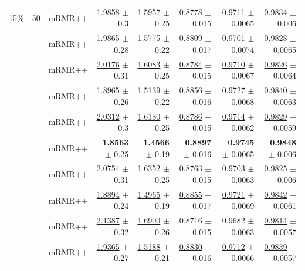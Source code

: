 \begin{longtable}{llp{}rrrrr}
\midrule
15\% & 50 & mRMR++ & \underline{1.9858} {\scriptsize $\pm$ 0.3} & \underline{1.5957} {\scriptsize $\pm$ 0.25} & \underline{0.8778} {\scriptsize $\pm$ 0.015} & \underline{0.9711} {\scriptsize $\pm$ 0.0065} & \underline{0.9834} {\scriptsize $\pm$ 0.006} \\
 &  & mRMR++ & \underline{1.9865} {\scriptsize $\pm$ 0.28} & \underline{1.5775} {\scriptsize $\pm$ 0.22} & \underline{0.8809} {\scriptsize $\pm$ 0.017} & \underline{0.9701} {\scriptsize $\pm$ 0.0074} & \underline{0.9828} {\scriptsize $\pm$ 0.0065} \\
 &  & mRMR++ & \underline{2.0176} {\scriptsize $\pm$ 0.31} & \underline{1.6083} {\scriptsize $\pm$ 0.25} & \underline{0.8784} {\scriptsize $\pm$ 0.015} & \underline{0.9710} {\scriptsize $\pm$ 0.0067} & \underline{0.9826} {\scriptsize $\pm$ 0.0064} \\
 &  & mRMR++ & \underline{1.8965} {\scriptsize $\pm$ 0.26} & \underline{1.5139} {\scriptsize $\pm$ 0.22} & \underline{0.8856} {\scriptsize $\pm$ 0.016} & \underline{0.9727} {\scriptsize $\pm$ 0.0068} & \underline{0.9840} {\scriptsize $\pm$ 0.0063} \\
 &  & mRMR++ & \underline{2.0312} {\scriptsize $\pm$ 0.3} & \underline{1.6180} {\scriptsize $\pm$ 0.25} & \underline{0.8786} {\scriptsize $\pm$ 0.015} & \underline{0.9714} {\scriptsize $\pm$ 0.0062} & \underline{0.9829} {\scriptsize $\pm$ 0.0059} \\
 &  & mRMR++ & \textbf{1.8563} {\scriptsize $\pm$ 0.25} & \textbf{1.4566} {\scriptsize $\pm$ 0.19} & \textbf{0.8897} {\scriptsize $\pm$ 0.016} & \textbf{0.9745} {\scriptsize $\pm$ 0.0065} & \textbf{0.9848} {\scriptsize $\pm$ 0.006} \\
 &  & mRMR++ & \underline{2.0754} {\scriptsize $\pm$ 0.31} & \underline{1.6352} {\scriptsize $\pm$ 0.25} & \underline{0.8763} {\scriptsize $\pm$ 0.015} & \underline{0.9703} {\scriptsize $\pm$ 0.0063} & \underline{0.9825} {\scriptsize $\pm$ 0.006} \\
 &  & mRMR++ & \underline{1.8894} {\scriptsize $\pm$ 0.24} & \underline{1.4965} {\scriptsize $\pm$ 0.19} & \underline{0.8855} {\scriptsize $\pm$ 0.017} & \underline{0.9721} {\scriptsize $\pm$ 0.0069} & \underline{0.9842} {\scriptsize $\pm$ 0.0061} \\
 &  & mRMR++ & \underline{2.1387} {\scriptsize $\pm$ 0.32} & \underline{1.6900} {\scriptsize $\pm$ 0.26} & 0.8716 {\scriptsize $\pm$ 0.015} & 0.9682 {\scriptsize $\pm$ 0.0063} & \underline{0.9814} {\scriptsize $\pm$ 0.0057} \\
 &  & mRMR++ & \underline{1.9365} {\scriptsize $\pm$ 0.27} & \underline{1.5188} {\scriptsize $\pm$ 0.21} & \underline{0.8830} {\scriptsize $\pm$ 0.016} & \underline{0.9712} {\scriptsize $\pm$ 0.0066} & \underline{0.9839} {\scriptsize $\pm$ 0.0057} \\

\end{longtable}
